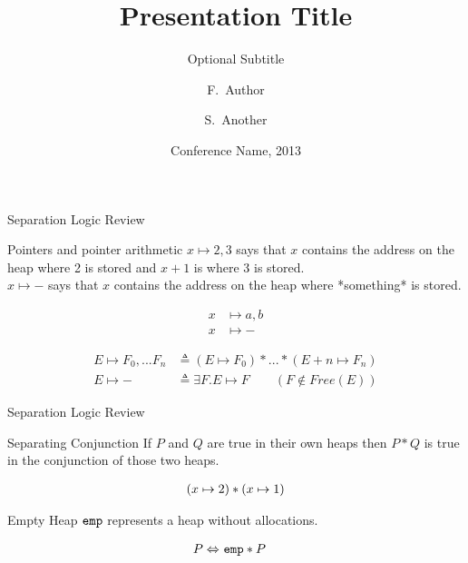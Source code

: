 \documentclass{beamer}
\title{Presentation Title}
\subtitle{Optional Subtitle}
\author{F.~Author\inst{1} \and S.~Another\inst{2}}
\institute[Universities of Somewhere and Elsewhere] %
{
  \inst{1}%
  Department of Computer Science\\
  University of Somewhere
  \and
  \inst{2}%
  Department of Theoretical Philosophy\\
  University of Elsewhere}
\date{Conference Name, 2013}
\newcommand{\btt}[1]{
  \mbox{\bm{$\mathtt{#1}$}}
}
\begin{document}
\setlength{\abovedisplayskip}{0pt}
\setlength{\belowdisplayskip}{0pt}
\setlength{\abovedisplayshortskip}{0pt}
\setlength{\belowdisplayshortskip}{0pt}

\begin{frame}{Separation Logic Review}
  \begin{block}{Pointers and pointer arithmetic}
    $x \mapsto 2,3$ says that $x$ contains the address on the heap where 2 is stored and $x+1$ is where 3 is stored.\\
    $x \mapsto -$ says that $x$ contains the address on the heap where *something* is stored.
  \end{block}

  \begin{example}
    \begin{align*}
      x &\mapsto a,b \\
      x &\mapsto -
    \end{align*}

\vspace{0.5cm}

    \begin{mdframed}
      \begin{align*}
        E \mapsto F_0,...F_n & \triangleq (E \mapsto F_0) * ... * (E + n \mapsto F_n)\\
        E \mapsto - & \triangleq \exists F.E \mapsto F \qquad (F \notin Free(E))
      \end{align*}
    \end{mdframed}
  \end{example}
\end{frame}


\begin{frame}{Separation Logic Review}
  \begin{block}{Separating Conjunction}
    If $P$ and $Q$ are true in their own heaps then $P * Q$ is true in the conjunction of those two heaps.
  \end{block}

  \begin{example}
    \begin{align*}
      \vspace*{-1cm}
      (x \mapsto 2) * (x \mapsto 1)
    \end{align*}
  \end{example}

  \begin{block}{Empty Heap}
    $\btt{emp}$ represents a heap without allocations.
  \end{block}

  \begin{example}
    \begin{align*}
      P \Leftrightarrow\ &\btt{emp} * P
    \end{align*}
  \end{example}
\end{frame}
\end{document}
